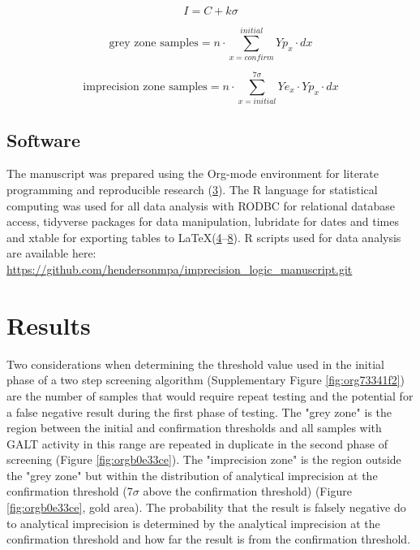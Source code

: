 \documentclass[review]{elsarticle}
\begin{document}
\begin{equation}\label{eq:initial}
I = C + k\sigma 
\end{equation}

\begin{equation}\label{eq:grey}
\text{grey zone samples}  =  n \cdot \sum_{x=confirm}^{initial} Yp_x \cdot dx
\end{equation}

\begin{equation}\label{eq:imprecision}
\text{imprecision zone samples}  =  n \cdot \sum_{x=initial}^{7\sigma} Ye_x \cdot Yp_x \cdot dx
\end{equation}

\subsection*{Software}
\label{sec:orgb54bbf6}
The manuscript was prepared using the Org-mode environment for
literate programming and reproducible research (\hyperlink{citeproc_bib_item_3}{3}). The R language for statistical computing was used
for all data analysis with RODBC for relational database access,
tidyverse packages for data manipulation, lubridate for dates and
times and xtable for exporting tables to
\LaTeX (\hyperlink{citeproc_bib_item_4}{4}–\hyperlink{citeproc_bib_item_8}{8}). R scripts
used for data analysis are available here:
\url{https://github.com/hendersonmpa/imprecision\_logic\_manuscript.git}

\section*{Results}
\label{sec:org19d1bcc}

Two considerations when determining the threshold value used in the
initial phase of a two step screening algorithm (Supplementary Figure \ref{fig:org73341f2})
are the number of samples that would require repeat testing and the
potential for a false negative result during the first phase of
testing.  The "grey zone" is the region between the initial and
confirmation thresholds and all samples with GALT activity in this
range are repeated in duplicate in the second phase of screening
(Figure \ref{fig:orgb0e33ce}). The "imprecision zone" is
the region outside the "grey zone" but within the distribution of
analytical imprecision at the confirmation threshold (7\(\sigma\) above
the confirmation threshold) (Figure \ref{fig:orgb0e33ce}, gold area). The
probability that the result is falsely negative do to analytical
imprecision is determined by the analytical imprecision at the
confirmation threshold and how far the result is from the confirmation
threshold.
\end{document}
